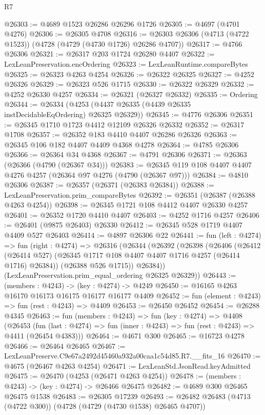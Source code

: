 \begin{lexlean}{R7}
\begin{coremodule}
@26303 := @4689 @1523 @26286 @26296 @1726
@26305 := @4697 (@4701 @4276)
@26306 := @26305 @4708
@26316 := @26303 @26306 (@4713 (@4722 @1523)) (@4728 (@4729 (@4730 @1726) @26286 @4707))
@26317 := @4766 @26306
@26321 := @26317 @203 @1724 @26280 @4407
@26322 := LexLeanPreservation.encOrdering
@26323 := LexLeanRuntime.compareBytes
@26325 := @26323 @4263 @4254
@26326 := @26322 @26325
@26327 := @4252 @26326
@26329 := @26323 @526 @1715
@26330 := @26322 @26329
@26332 := @4252 @26330 @4257
@26334 := @26321 (@26327 @26332)
@26335 := Ordering
@26344 := @26334 (@4253 (@4437 @26335 (@4439 @26335 instDecidableEqOrdering) @26325 @26329))
@26345 := @4776 @26306
@26351 := @26345 @1710 @1723 @4412 @12109 @26326 @26332
@26352 := @26317 @1708
@26357 := @26352 @183 @4410 @4407 @26286 @26326
@26363 := @26345 @106 @182 @4407 @4409 @4368 @4278
@26364 := @4785 @26306
@26366 := @26364 @34 @4368
@26367 := @4791 @26306
@26371 := @26363 (@26366 (@4790 (@26367 @34)))
@26383 := @26345 @119 @108 @4407 @4407 @4276 @4257 (@26364 @97 @4276 (@4790 (@26367 @97)))
@26384 := @4810 @26306
@26387 := @26357 (@26371 (@26383 @26384))
@26388 := LexLeanPreservation.prim_compareBytes
@26392 := @26351 (@26387 (@26388 @4263 @4254))
@26398 := @26345 @1721 @108 @4412 @4407 @26330 @4257
@26401 := @26352 @1720 @4410 @4407
@26403 := @4252 @1716 @4257
@26406 := @26401 (@9875 @26403) @26330
@26412 := @26345 @528 @1719 @4407 @4409 @527 @26403
@26414 := @4897 @26306 @22
@26441 := fun (left : @4274) =>
  fun (right : @4274) =>
  @26316
    (@26344
      (@26392
        (@26398
          (@26406
            (@26412 (@26414 @527) (@26345 @1717 @108 @4407 @4407 @1716 @4257 (@26414 @1716) @26384))
            (@26388 @526 @1715))
          @26384))
      (LexLeanPreservation.prim_equal_ordering @26325 @26329))
@26443 := (members : @4243) -> (key : @4274) -> @4249
@26450 := @16165 @4263 @16170 @16173 @16175 @16177 @16177 @4409
@26452 := fun (element : @4243) => fun (rest : @4243) => @4409
@26453 := @26450 @26452
@26454 := @26288 @4345
@26463 := fun (members : @4243) =>
  fun (key : @4274) =>
  @4408
    (@26453
      (fun (last : @4274) => fun (inner : @4243) => fun (rest : @4243) => @4411 (@26454 @4383)))
@26464 := @4671 @300
@26465 := @16723 @4278
@26466 := @26464 @26465
@26467 := LexLeanPreserve.C9e67a2492d45460a932a00caa1c54d85.R7.__fits_16
@26470 := @4675 (@26467 @4263 @4254)
@26471 := LexLeanStd.JsonRead.keyAdmitted
@26475 := @26470 (@4253 (@26471 @4263 @4254))
@26478 := (members : @4243) -> (key : @4274) -> @26466 @26475
@26482 := @4689 @300 @26465 @26475 @1538
@26483 := @26305 @17239
@26493 := @26482 @26483 (@4713 (@4722 @300)) (@4728 (@4729 (@4730 @1538) @26465 @4707))

\end{coremodule}
\end{lexlean}

